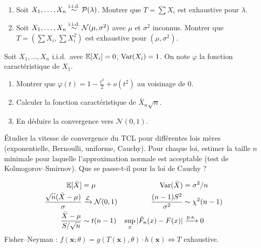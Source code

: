 \begin{exercice}
\begin{enumerate}
\item Soit $X_1,\ldots,X_n\overset{\text{i.i.d.}}{\sim}\mathcal{P}(\lambda)$. Montrer que $T=\sum X_i$ est exhaustive pour $\lambda$.
\item Soit $X_1,\ldots,X_n\overset{\text{i.i.d.}}{\sim}\mathcal{N}(\mu,\sigma^2)$ avec $\mu$ et $\sigma^2$ inconnus. Montrer que $T=(\sum X_i,\sum X_i^2)$ est exhaustive pour $(\mu,\sigma^2)$.
\end{enumerate}
\end{exercice}

\begin{exercice}
Soit $X_1,\ldots,X_n$ i.i.d.\ avec $\mathbb{E}[X_i]=0$, $\operatorname{Var}(X_i)=1$. On note $\varphi$ la fonction caract\'eristique de $X_1$.
\begin{enumerate}
\item Montrer que $\varphi(t)=1-\frac{t^2}{2}+o(t^2)$ au voisinage de 0.
\item Calculer la fonction caract\'eristique de $\bar{X}_n\sqrt{n}$.
\item En d\'eduire la convergence vers $\mathcal{N}(0,1)$.
\end{enumerate}
\end{exercice}

\begin{exercice}
\'Etudier la vitesse de convergence du TCL pour diff\'erentes lois m\`eres (exponentielle, Bernoulli, uniforme, Cauchy). Pour chaque loi, estimer la taille $n$ minimale pour laquelle l'approximation normale est acceptable (test de Kolmogorov--Smirnov). Que se passe-t-il pour la loi de Cauchy ?
\end{exercice}

\begin{formules}
\begin{align*}
\mathbb{E}[\bar{X}] &= \mu & \operatorname{Var}(\bar{X}) &= \sigma^2/n \\
\frac{\sqrt{n}(\bar{X}-\mu)}{\sigma} &\xrightarrow{\mathcal{L}} \mathcal{N}(0,1) &
\frac{(n-1)S^2}{\sigma^2} &\sim \chi^2(n-1) \\
\frac{\bar{X}-\mu}{S/\sqrt{n}} &\sim t(n-1) &
\sup_x|\hat{F}_n(x)-F(x)| &\xrightarrow{\text{p.s.}} 0
\end{align*}
Fisher--Neyman : $f(\mathbf{x};\theta) = g(T(\mathbf{x}),\theta)\cdot h(\mathbf{x}) \iff T$ exhaustive.
\end{formules}
